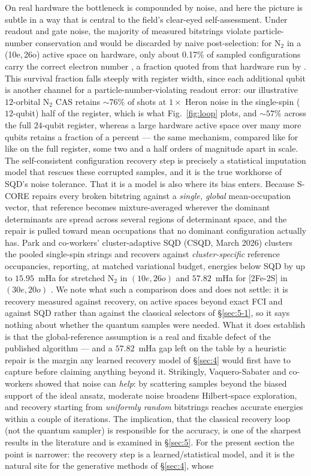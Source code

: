 \documentclass[onecolumn,a4paper]{quantumarticle}
\begin{document}
On real hardware the bottleneck is compounded by noise, and here the picture is subtle in a way that is central to the field's clear-eyed self-assessment. Under readout and gate noise, the majority of measured bitstrings violate particle-number conservation and would be discarded by naive post-selection: for N$_2$ in a (10e,\,26o) active space on hardware, only about 0.17\% of sampled configurations carry the correct electron number \cite{robledomoreno2025}, a fraction quoted from that hardware run by \cite{vaquerosabater2026}. This survival fraction falls steeply with register width, since each additional qubit is another channel for a particle-number-violating readout error: our illustrative $12$-orbital N$_2$ CAS retains ${\sim}76\%$ of shots at $1\times$ Heron noise in the single-spin ($12$-qubit) half of the register, which is what Fig.~\ref{fig:loop} plots, and ${\sim}57\%$ across the full $24$-qubit register, whereas a large hardware active space over many more qubits retains a fraction of a percent --- the same mechanism, compared like for like on the full register, some two and a half orders of magnitude apart in scale. The self-consistent configuration recovery step is precisely a statistical imputation model that rescues these corrupted samples, and it is the true workhorse of SQD's noise tolerance. That it is a model is also where its bias enters. Because S-CORE repairs every broken bitstring against a \emph{single, global} mean-occupation vector, that reference becomes mixture-averaged wherever the dominant determinants are spread across several regions of determinant space, and the repair is pulled toward mean occupations that no dominant configuration actually has. Park and co-workers' cluster-adaptive SQD (CSQD, March 2026) clusters the pooled single-spin strings and recovers against \emph{cluster-specific} reference occupancies, reporting, at matched variational budget, energies below SQD by up to $15.95$~mHa for stretched N$_2$ in $(10e,26o)$ and $57.82$~mHa for [2Fe-2S] in $(30e,20o)$ \cite{park2026csqd}. We note what such a comparison does and does not settle: it is recovery measured against recovery, on active spaces beyond exact FCI and against SQD rather than against the classical selectors of \S\ref{sec:5-1}, so it says nothing about whether the quantum samples were needed. What it does establish is that the global-reference assumption is a real and fixable defect of the published algorithm --- and a $57.82$~mHa gap left on the table by a heuristic repair is the margin any learned recovery model of \S\ref{sec:4} would first have to capture before claiming anything beyond it. Strikingly, Vaquero-Sabater and co-workers showed that noise can \emph{help}: by scattering samples beyond the biased support of the ideal ansatz, moderate noise broadens Hilbert-space exploration, and recovery starting from \emph{uniformly random} bitstrings reaches accurate energies within a couple of iterations. The implication, that the classical recovery loop (not the quantum sampler) is responsible for the accuracy, is one of the sharpest results in the literature and is examined in \S\ref{sec:5}. For the present section the point is narrower: the recovery step is a learned/statistical model, and it is the natural site for the generative methods of \S\ref{sec:4}, whose 
\end{document}
